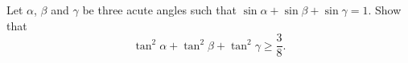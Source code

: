 Let $\alpha$,  $\beta$ and $\gamma$ be three acute angles such that $\sin \alpha+\sin \beta+\sin \gamma = 1$. Show that\[\tan^{2}\alpha+\tan^{2}\beta+\tan^{2}\gamma \geq \frac{3}{8}. \]